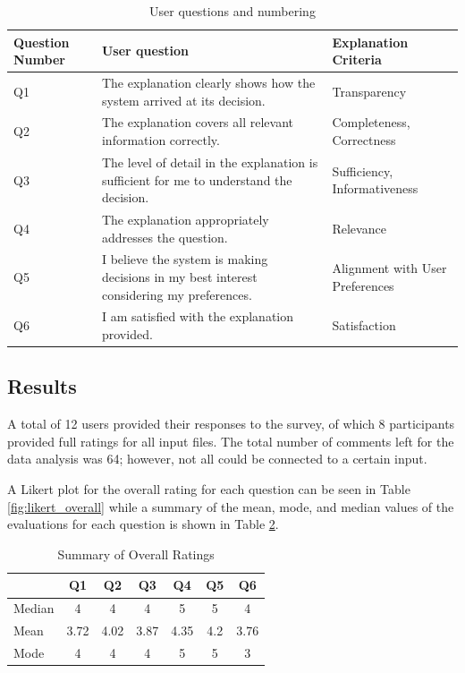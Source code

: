\documentclass[sigconf,nonacm]{acmart}
\begin{document}
\begin{table}[h]
    \centering
    \begin{tabularx}{\columnwidth}{p{1.2cm} X p{2cm}}
        \toprule
        \textbf{Question Number} & \textbf{User question} & \textbf{Explanation Criteria}\\
        \midrule
        Q1 & The explanation clearly shows how the system arrived at its decision. & Transparency \\
        Q2 & The explanation covers all relevant information correctly. & Completeness, Correctness\\
        Q3 & The level of detail in the explanation is sufficient for me to understand the decision. & Sufficiency, Informativeness \\
        Q4 & The explanation appropriately addresses the question. & Relevance \\
        Q5 & I believe the system is making decisions in my best interest considering my preferences. & Alignment with User Preferences\\
        Q6 & I am satisfied with the explanation provided. & Satisfaction \\
        \bottomrule
    \end{tabularx}
    \caption{User questions and numbering}
    \label{tab:questions}
\end{table}



\subsection{Results} \label{subsec:Results}

A total of 12 users provided their responses to the survey, of which 8 participants provided full ratings for all input files. The total number of comments left for the data analysis was 64; however, not all could be connected to a certain input.

A Likert plot for the overall rating for each question can be seen in Table \ref{fig:likert_overall} while a summary of the mean, mode, and median values of the evaluations for each question is shown in Table \ref{tab:values_overall}.


\begin{table}[h]
    \centering
    \begin{tabular}{lcccccc}
        \toprule
        & Q1 & Q2 & Q3 & Q4 & Q5 & Q6 \\
        \midrule
        Median & 4 & 4 & 4 & 5 & 5 & 4 \\
        Mean & 3.72 & 4.02 & 3.87 & 4.35 & 4.2 & 3.76 \\
        Mode & 4 & 4 & 4 & 5 & 5 & 3 \\
        \bottomrule
    \end{tabular}
    \caption{Summary of Overall Ratings}
    \label{tab:values_overall}
\end{table}
\end{document}
